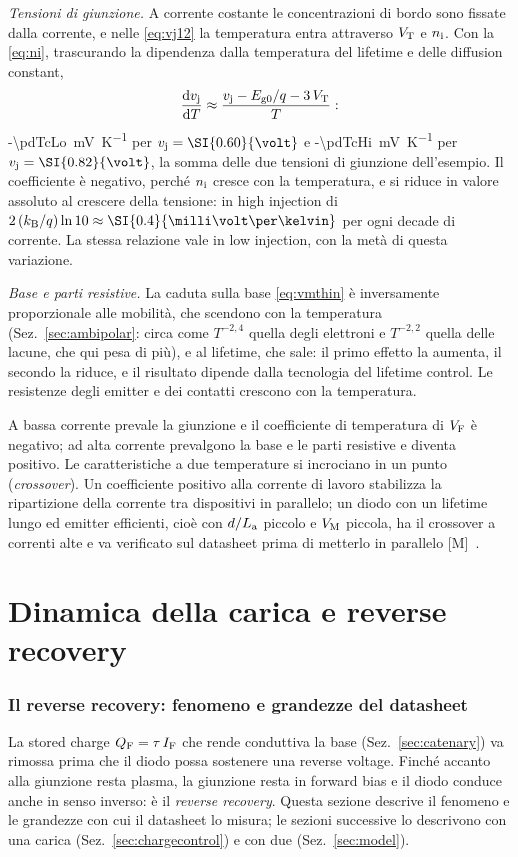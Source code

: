 \documentclass[10pt,a4paper]{scrartcl}
\let\newcommand\pdvaluedefine
\newcommand{\IF}{I_\mathrm{F}}
\newcommand{\VF}{V_\mathrm{F}}
\newcommand{\vj}{v_\mathrm{j}}
\newcommand{\VT}{V_\mathrm{T}}
\newcommand{\diff}{\mathrm{d}}
\newcommand{\nint}{n_\mathrm{i}}
\newcommand{\La}{L_\mathrm{a}}
\newcommand{\VM}{V_\mathrm{M}}
\newcommand{\QF}{Q_\mathrm{F}}
\newcommand{\kB}{k_\mathrm{B}}
\newcommand{\Pp}{p\textsuperscript{+}}
\newcommand{\Nm}{n\textsuperscript{--}}
\begin{document}
\emph{Tensioni di giunzione.} A corrente costante le concentrazioni di bordo sono fissate dalla corrente, e nelle \eqref{eq:vj12} la temperatura entra attraverso $\VT$ e $\nint$. Con la \eqref{eq:ni}, trascurando la dipendenza dalla temperatura del lifetime e delle diffusion constant,
\begin{equation}
\frac{\diff\vj}{\diff T} \approx \frac{\vj - E_\mathrm{g0}/q - 3\,\VT}{T} :
\label{eq:tc}
\end{equation}
\SI{-\pdTcLo}{\milli\volt\per\kelvin} per $\vj = \SI{\pdTcVjLo}{\volt}$ e \SI{-\pdTcHi}{\milli\volt\per\kelvin} per $\vj = \SI{\pdTcVjHi}{\volt}$, la somma delle due tensioni di giunzione dell'esempio. Il coefficiente è negativo, perché $\nint$ cresce con la temperatura, e si riduce in valore assoluto al crescere della tensione: in high injection di $2\,(\kB/q)\ln 10 \approx \SI{0.4}{\milli\volt\per\kelvin}$ per ogni decade di corrente. La stessa relazione vale in low injection, con la metà di questa variazione.

\emph{Base e parti resistive.} La caduta sulla base \eqref{eq:vmthin} è inversamente proporzionale alle mobilità, che scendono con la temperatura (Sez.~\ref{sec:ambipolar}: circa come $T^{-2,4}$ quella degli elettroni e $T^{-2,2}$ quella delle lacune, che qui pesa di più), e al lifetime, che sale: il primo effetto la aumenta, il secondo la riduce, e il risultato dipende dalla tecnologia del lifetime control. Le resistenze degli emitter e dei contatti crescono con la temperatura.

A bassa corrente prevale la giunzione e il coefficiente di temperatura di $\VF$ è negativo; ad alta corrente prevalgono la base e le parti resistive e diventa positivo. Le caratteristiche a due temperature si incrociano in un punto (\emph{crossover}). Un coefficiente positivo alla corrente di lavoro stabilizza la ripartizione della corrente tra dispositivi in parallelo; un diodo con un lifetime lungo ed emitter efficienti, cioè con $d/\La$ piccolo e $\VM$ piccola, ha il crossover a correnti alte e va verificato sul datasheet prima di metterlo in parallelo [M]~\cite{lutz}.
\part{Dinamica della carica e reverse recovery}

\section{Il reverse recovery: fenomeno e grandezze del datasheet}
\label{sec:datasheet}
La stored charge $\QF = \tau\,\IF$ che rende conduttiva la base (Sez.~\ref{sec:catenary}) va rimossa prima che il diodo possa sostenere una reverse voltage. Finché accanto alla giunzione \Pp\Nm{} resta plasma, la giunzione resta in forward bias e il diodo conduce anche in senso inverso: è il \emph{reverse recovery}. Questa sezione descrive il fenomeno e le grandezze con cui il datasheet lo misura; le sezioni successive lo descrivono con una carica (Sez.~\ref{sec:chargecontrol}) e con due (Sez.~\ref{sec:model}).
\end{document}

